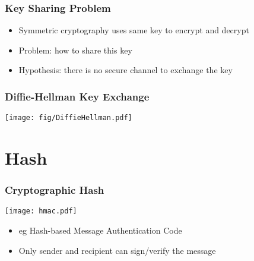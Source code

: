 \documentclass[
hyperref={pdfpagelabels=false}
,xcolor=table
]
{beamer}
\begin{document}




\begin{frame}
  \frametitle{Key Sharing Problem}
  \begin{itemize}
  \item Symmetric cryptography uses same key to encrypt and decrypt
  \item Problem: how to share this key
  \item Hypothesis: there is no secure channel to exchange the key
  \end{itemize}
\end{frame}


\begin{frame}
  \frametitle{Diffie-Hellman Key Exchange}
  \begin{center}
    \texttt{[image: fig/DiffieHellman.pdf]}
  \end{center}
\end{frame}



\section{Hash}


\begin{frame}
  \frametitle{Cryptographic Hash}


  \begin{center}
    \texttt{[image: hmac.pdf]}
  \end{center}
  
  \begin{itemize}
  \item eg Hash-based Message Authentication Code
  \item Only sender and recipient can sign/verify the message
  \end{itemize}
  
\end{frame}
\end{document}
